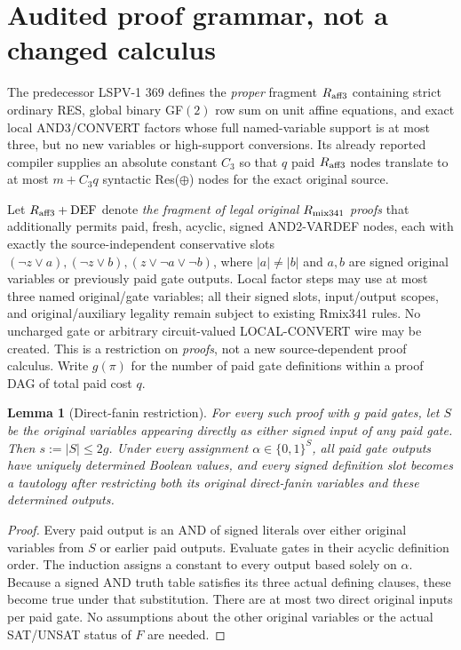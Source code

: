 \documentclass[11pt]{article}
\newtheorem{lemma}[theorem]{Lemma}
\begin{document}
\section*{Audited proof grammar, not a changed calculus}
The predecessor LSPV-1 369 defines the \emph{proper} fragment $R_{\rm aff3}$ containing strict ordinary RES, global binary GF$(2)$ row sum on unit affine equations, and exact local AND3/CONVERT factors whose full named-variable support is at most three, but no new variables or high-support conversions. Its already reported compiler supplies an absolute constant $C_3$ so that $q$ paid $R_{\rm aff3}$ nodes translate to at most $m+C_3q$ syntactic Res($\oplus$) nodes for the exact original source.

Let $R_{\rm aff3}+\mathrm{DEF}$ denote \emph{the fragment of legal original $R_{\rm mix341}$ proofs} that additionally permits paid, fresh, acyclic, signed AND2-VARDEF nodes, each with exactly the source-independent conservative slots $(\neg z\lor a),(\neg z\lor b),(z\lor\neg a\lor\neg b)$, where $|a|\ne|b|$ and $a,b$ are signed original variables or previously paid gate outputs. Local factor steps may use at most three named original/gate variables; all their signed slots, input/output scopes, and original/auxiliary legality remain subject to existing Rmix341 rules. No uncharged gate or arbitrary circuit-valued LOCAL-CONVERT wire may be created. This is a restriction on \emph{proofs}, not a new source-dependent proof calculus. Write $g(\pi)$ for the number of paid gate definitions within a proof DAG of total paid cost $q$.

\begin{lemma}[Direct-fanin restriction]
For every such proof with $g$ paid gates, let $S$ be the original variables appearing \emph{directly} as either signed input of any paid gate. Then $s:=|S|\le2g$. Under every assignment $\alpha\in\{0,1\}^S$, all paid gate outputs have uniquely determined Boolean values, and every signed definition slot becomes a tautology after restricting both its original direct-fanin variables and these determined outputs.
\end{lemma}
\begin{proof}
Every paid output is an AND of signed literals over either original variables from $S$ or earlier paid outputs. Evaluate gates in their acyclic definition order. The induction assigns a constant to every output based solely on $\alpha$. Because a signed AND truth table satisfies its three actual defining clauses, these become true under that substitution. There are at most two direct original inputs per paid gate. No assumptions about the other original variables or the actual SAT/UNSAT status of $F$ are needed.
\end{proof}
\end{document}
